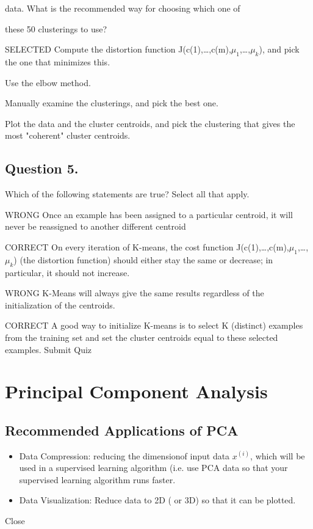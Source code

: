 \documentclass[11pt]{article} %
\begin{document}
	data. What is the recommended way for choosing which one of
	
	these 50 clusterings to use?
	
	
	SELECTED Compute the distortion function J(c(1),…,c(m),$\mu_1$,…,$\mu_k$), and pick the one that minimizes this.
	
	Use the elbow method.
	
	Manually examine the clusterings, and pick the best one.
	
	Plot the data and the cluster centroids, and pick the clustering that gives the most "coherent" cluster centroids.
\subsection{ Question 5. } 
	Which of the following statements are true? Select all that apply.
	
	WRONG Once an example has been assigned to a particular centroid, it will never be reassigned to another different centroid
	
	CORRECT On every iteration of K-means, the cost function J(c(1),…,c(m),$\mu_1$,…,$\mu_k$) (the distortion function) should either stay the same or decrease; in particular, it should not increase.
	
	WRONG K-Means will always give the same results regardless of the initialization of the centroids.
	
	CORRECT A good way to initialize K-means is to select K (distinct) examples from the training set and set the cluster centroids equal to these selected examples.
	Submit Quiz
	
	

\section{Principal Component Analysis}
\subsection{Recommended Applications of PCA}

\begin{itemize}
	\item Data Compression: reducing the dimensionof input data $x^{(i)}$, which will be used in a supervised learning algorithm
	(i.e. use PCA data so that your supervised learning algorithm runs faster.
	
	\item Data Visualization: Reduce data to 2D ( or 3D) so that it can be plotted.
\end{itemize}
Close
\end{document}
